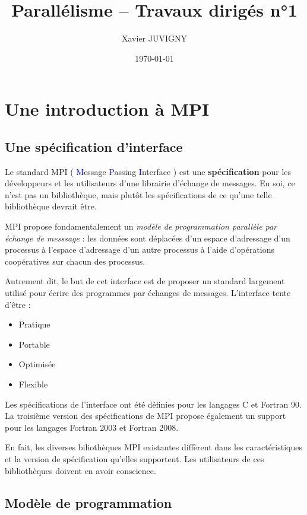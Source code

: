 \documentclass[11pt,a4paper]{article}
\author{Xavier JUVIGNY}
\date{\today}
\title{Parallélisme -- Travaux dirigés n°1}
\begin{document}
\maketitle
\tableofcontents


\section{Une introduction à MPI} 
\subsection{Une spécification d'interface}

Le standard MPI ( \textcolor{blue}{M}essage \textcolor{blue}{P}assing \textcolor{blue}{I}nterface ) est une 
\textbf{sp\'ecification} pour les d\'eveloppeurs et
les utilisateurs d'une librairie d'\'echange de messages. En soi, ce n'est pas un bibliothèque, mais plut\^ot
les sp\'ecifications de ce qu'une telle biblioth\`eque devrait \^etre.

MPI propose fondamentalement un \textsl{mod\`ele de programmation parall\`ele par \'echange de messsage} : les donn\'ees sont d\'eplac\'ees
d'un espace d'adressage d'un processus \`a l'espace d'adressage d'un autre processus \`a l'aide d'op\'erations
coop\'eratives sur chacun des processus.

Autrement dit, le but de cet interface est de proposer un standard largement utilis\'e
pour \'ecrire des programmes par \'echanges de messages. L'interface tente d'\^etre :
\begin{itemize}
\item Pratique
\item Portable
\item Optimis\'ee
\item Flexible
\end{itemize}

Les sp\'ecifications de l'interface ont \'et\'e d\'efinies pour les langages C et Fortran 90. 
La troisi\`eme version des
sp\'ecifications de MPI propose \'egalement un support pour les langages Fortran 2003 et Fortran 2008.

En fait, les diverses bilioth\`eques MPI existantes diff\`erent dans les caract\'eristiques et la version de
sp\'ecification qu'elles supportent. Les utilisateurs de ces biblioth\`eques doivent en avoir conscience.

\subsection{Mod\`ele de programmation}
\end{document}
